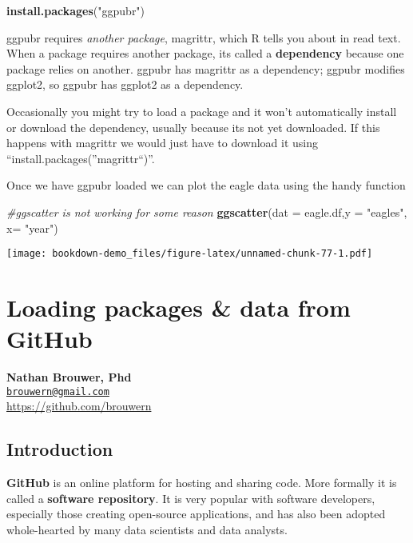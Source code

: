 \documentclass[]{book}
\newenvironment{Shaded}{\begin{snugshade}}{\end{snugshade}}
\newcommand{\KeywordTok}[1]{\textcolor[rgb]{0.13,0.29,0.53}{\textbf{#1}}}
\newcommand{\DataTypeTok}[1]{\textcolor[rgb]{0.13,0.29,0.53}{#1}}
\newcommand{\StringTok}[1]{\textcolor[rgb]{0.31,0.60,0.02}{#1}}
\newcommand{\CommentTok}[1]{\textcolor[rgb]{0.56,0.35,0.01}{\textit{#1}}}
\newcommand{\NormalTok}[1]{#1}
\theoremstyle{definition}
\theoremstyle{definition}
\theoremstyle{definition}
\theoremstyle{remark}
\begin{document}
\begin{Shaded}
\begin{Highlighting}[]
\KeywordTok{install.packages}\NormalTok{(}\StringTok{"ggpubr"}\NormalTok{)}
\end{Highlighting}
\end{Shaded}

ggpubr requires \emph{another package}, magrittr, which R tells you
about in read text. When a package requires another package, its called
a \textbf{dependency} because one package relies on another. ggpubr has
magrittr as a dependency; ggpubr modifies ggplot2, so ggpubr has ggplot2
as a dependency.

Occasionally you might try to load a package and it won't automatically
install or download the dependency, usually because its not yet
downloaded. If this happens with magrittr we would just have to download
it using ``install.packages(''magrittr``)''.

Once we have ggpubr loaded we can plot the eagle data using the handy
function

\begin{Shaded}
\begin{Highlighting}[]
\CommentTok{#ggscatter is not working for some reason }
\KeywordTok{ggscatter}\NormalTok{(}\DataTypeTok{dat =}\NormalTok{ eagle.df,}\DataTypeTok{y =} \StringTok{"eagles"}\NormalTok{, }\DataTypeTok{x=} \StringTok{"year"}\NormalTok{)}
\end{Highlighting}
\end{Shaded}

\texttt{[image: bookdown-demo\_files/figure-latex/unnamed-chunk-77-1.pdf]}

\chapter{Loading packages \& data from
GitHub}\label{loading-packages-data-from-github}

\textbf{Nathan Brouwer, Phd}\\
\href{mailto:brouwern@gmail.com}{\nolinkurl{brouwern@gmail.com}}\\
\url{https://github.com/brouwern}\\
\citet{lobrowR}

\section{Introduction}\label{introduction-2}

\textbf{GitHub} is an online platform for hosting and sharing code. More
formally it is called a \textbf{software repository}. It is very popular
with software developers, especially those creating open-source
applications, and has also been adopted whole-hearted by many data
scientists and data analysts.
\end{document}
